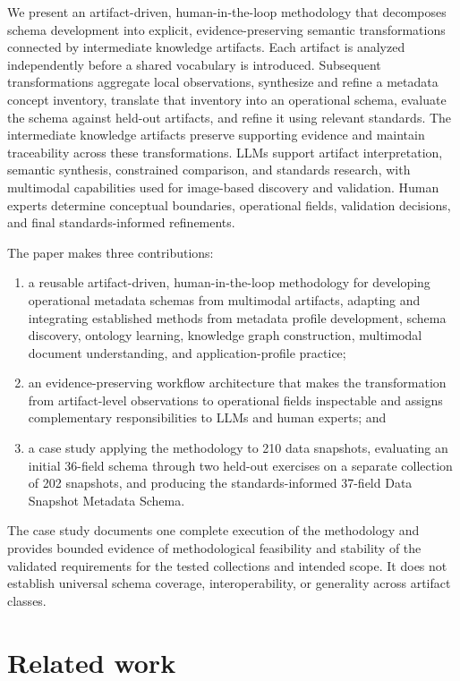 \documentclass{article}
\begin{document}
We present an artifact-driven, human-in-the-loop methodology that decomposes schema development into explicit, evidence-preserving semantic transformations connected by intermediate knowledge artifacts. Each artifact is analyzed independently before a shared vocabulary is introduced. Subsequent transformations aggregate local observations, synthesize and refine a metadata concept inventory, translate that inventory into an operational schema, evaluate the schema against held-out artifacts, and refine it using relevant standards. The intermediate knowledge artifacts preserve supporting evidence and maintain traceability across these transformations. LLMs support artifact interpretation, semantic synthesis, constrained comparison, and standards research, with multimodal capabilities used for image-based discovery and validation. Human experts determine conceptual boundaries, operational fields, validation decisions, and final standards-informed refinements.

The paper makes three contributions:

\begin{enumerate}
    \item a reusable artifact-driven, human-in-the-loop methodology for developing operational metadata schemas from multimodal artifacts, adapting and integrating established methods from metadata profile development, schema discovery, ontology learning, knowledge graph construction, multimodal document understanding, and application-profile practice;
    \item an evidence-preserving workflow architecture that makes the transformation from artifact-level observations to operational fields inspectable and assigns complementary responsibilities to LLMs and human experts; and
    \item a case study applying the methodology to 210 data snapshots, evaluating an initial 36-field schema through two held-out exercises on a separate collection of 202 snapshots, and producing the standards-informed 37-field Data Snapshot Metadata Schema.
\end{enumerate}

The case study documents one complete execution of the methodology and provides bounded evidence of methodological feasibility and stability of the validated requirements for the tested collections and intended scope. It does not establish universal schema coverage, interoperability, or generality across artifact classes.

\section{Related work}
\end{document}
